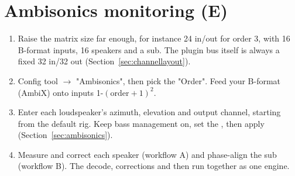 \section{Ambisonics monitoring (E)}
\begin{enumerate}[nosep]
  \item Raise the matrix size far enough, for instance 24 in/out for order 3, with 16 B-format inputs, 16 speakers and a sub. The plugin bus itself is always a fixed 32 in/32 out (Section~\ref{sec:channellayout}).
  \item Config tool $\rightarrow$ "Ambisonics", then pick the "Order". Feed your B-format (AmbiX) onto inputs 1-$(\mathrm{order}+1)^2$.
  \item Enter each loudspeaker's azimuth, elevation and output channel, starting from the default rig. Keep bass management on, set the , then apply (Section~\ref{sec:ambisonics}).
  \item Measure and correct each speaker (workflow A) and phase-align the sub (workflow B). The decode, corrections and  then run together as one engine.
\end{enumerate}


